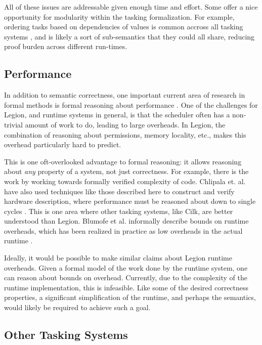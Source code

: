 \documentclass[sigconf]{acmart}
\begin{document}
All of these issues are addressable given enough time and effort. Some offer a
nice opportunity for modularity within the tasking formalization. For example,
ordering tasks based on dependencies of values is common accross all tasking
systems \cite{blumofe1995cilk, kaiser2014hpx}, and is likely a sort of
sub-semantics that they could all share, reducing proof burden across different
run-times.

\subsection{Performance}

In addition to semantic correctness, one important current area of research in
formal methods is formal
reasoning about performance \cite{mccarthy2017coq, chargueraud2015machine}. One
of the challenges for Legion, and runtime systems in general, is that the
scheduler often has a non-trivial amount of work to do, leading to large
overheads. In Legion, the combination of reasoning about permissions, memory
locality, etc., makes this overhead particularly hard to predict. 

This is one oft-overlooked advantage to formal reasoning: it allows reasoning
about \emph{any} property of a system, not just correctness. For example, there
is the work by \cite{mccarthy2017coq} working towards formally verified
complexity of code.  Chlipala et. al. have also used techniques like those
described here to construct and verify hardware description, where performance
must be reasoned about down to single cycles \cite{braibant2013formal}.  This
is one area where other tasking systems, like Cilk, are better understood than
Legion. Blumofe et al. informally describe bounds on runtime overheads, which
has been realized in practice as low overheads in the actual runtime
\cite{blumofe1995cilk}. 

Ideally, it would be possible to make similar claims about Legion runtime overheads.
Given a formal model of the work done by the runtime system, one can reason
about bounds on overhead. Currently, due to the complexity of the runtime
implementation, this is infeasible. Like some of the desired correctness
properties, a significant simplification of the runtime, and perhaps the
semantics, would likely be required to achieve such a goal.


\subsection{Other Tasking Systems}
\end{document}
